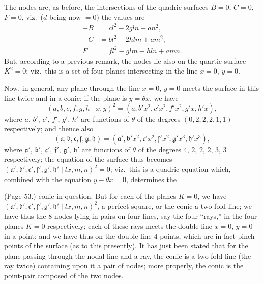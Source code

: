 \documentclass[11pt,a4paper]{article}
\begin{document}
The nodes are, as before, the intersections of the quadric surfaces $B = 0$, $C = 0$, $F = 0$, viz.\ ($d$ being now $= 0$) the values are
\begin{align*}
-B &= cl^2 - 2gln + an^2, \\
-C &= bl^2 - 2hlm + am^2, \\
F &= fl^2 - glm - hln + amn.
\end{align*}
But, according to a previous remark, the nodes lie also on the quartic surface $K^2 = 0$; viz.\ this is a set of four planes intersecting in the line $x = 0$, $y = 0$.

Now, in general, any plane through the line $x = 0$, $y = 0$ meets the surface in this line twice and in a conic; if the plane is $y = \theta x$, we have
\[
(a, b, c, f, g, h \mid x, y)^2 = (a, b'x^2, c'x^2, f'x^2, g'x, h'x),
\]
where $a$, $b'$, $c'$, $f'$, $g'$, $h'$ are functions of $\theta$ of the degrees $(0, 2, 2, 2, 1, 1)$ respectively; and thence also
\[
(\mathfrak{a}, \mathfrak{b}, \mathfrak{c}, \mathfrak{f}, \mathfrak{g}, \mathfrak{h}) = (\mathfrak{a}', \mathfrak{b}'x^2, \mathfrak{c}'x^2, \mathfrak{f}'x^2, \mathfrak{g}'x^3, \mathfrak{h}'x^3),
\]
where $\mathfrak{a}'$, $\mathfrak{b}'$, $\mathfrak{c}'$, $\mathfrak{f}'$, $\mathfrak{g}'$, $\mathfrak{h}'$ are functions of $\theta$ of the degrees $4$, $2$, $2$, $2$, $3$, $3$ respectively; the equation of the surface thus becomes $(\mathfrak{a}', \mathfrak{b}', \mathfrak{c}', \mathfrak{f}', \mathfrak{g}', \mathfrak{h}' \mid lx, m, n)^2 = 0$; viz.\ this is a quadric equation which, combined with the equation $y - \theta x = 0$, determines the

\bigskip

\noindent (Page 53.) conic in question. But for each of the planes $K = 0$, we have $(\mathfrak{a}', \mathfrak{b}', \mathfrak{c}', \mathfrak{f}', \mathfrak{g}', \mathfrak{h}' \mid lx, m, n)^2$, a perfect square, or the conic a two-fold line; we have thus the $8$ nodes lying in pairs on four lines, say the four ``rays,'' in the four planes $K = 0$ respectively; each of these rays meets the double line $x = 0$, $y = 0$ in a point; and we have thus on the double line $4$ points, which are in fact pinch-points of the surface (as to this presently). It has just been stated that for the plane passing through the nodal line and a ray, the conic is a two-fold line (the ray twice) containing upon it a pair of nodes; more properly, the conic is the point-pair composed of the two nodes.
\end{document}
